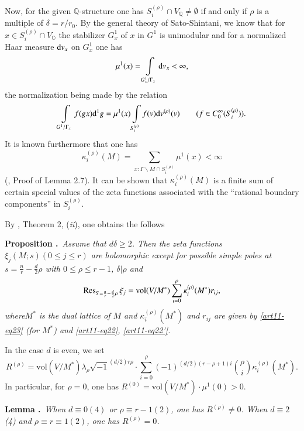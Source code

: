 Now, for the given $\mathbb{Q}$-structure one has $S^{(\rho)}_{i}\cap V_{\mathbb{Q}}\neq \emptyset$ if and only if $\rho$ is a multiple of $\delta=r/r_{0}$. By the general theory of Sato-Shintani, we know that for $x\in S^{(\rho)}_{i}\cap V_{\mathbb{O}}$ the stabilizer $G^{1}_{x}$ of $x$ in $G^{1}$ is unimodular and for a normalized Haar measure $\mathrm{d} v_{x}$ on $G^{1}_{x}$ one has
$$
\mu^{1}(x)=\int\limits_{G^{1}_{x}/\Gamma_{x}}\mathrm{d} v_{x}<\infty,
$$
the normalization being made by the relation
$$
\int\limits_{G^{1}/\Gamma_{x}}f(gx)\mathrm{d}^{1}g=\mu^{1}(x)\int\limits_{S_{i}^{(\rho)}}f(v)\mathrm{d} v^{(\rho)}(v)\qquad (f\in C^{\infty}_{0}(S^{(\rho)}_{i})).
$$
It is known furthermore that one has
\begin{equation}
\kappa_{i}^{(\rho)}(M)=\sum\limits_{x:\Gamma\backslash M\cap S_{i}^{(\rho)}}\mu^{1}(x)<\infty\label{art11-eq23}
\end{equation}
(\cite{art11-keySS}, Proof of Lemma 2.7). It can be shown that $\kappa^{(\rho)}_{i}(M)$ is a finite sum of certain special values of the zeta functions associated with the ``rational boundary components'' in $S^{(\rho)}_{i}$.

By \cite{art11-keySS}, Theorem 2, ({\em ii}), one obtains the follows

\medskip
\noindent
{\bf Proposition .\label{art11-prop2}}~{\em Assume that $d\delta \geq 2$. Then the zeta functions $\xi_{j}(M;s)(0\leq j\leq r)$ are holomorphic except for possible simple poles at $s=\frac{n}{r}-\frac{d}{2}\rho$ with $0\leq \rho\leq r-1$, $\delta |\rho$ and}
\begin{equation}
\operatorname{Res}_{S=\frac{n}{r}-\frac{d}{2}\rho}\xi_{j}=\text{vol} (V/M^{*})\sum\limits^{\rho}_{i=0}\kappa^{(\rho)}_{i}(M^{*})r_{ij},\label{art11-eq24}
\end{equation}
{\em where\pageoriginale $M^{*}$ is the dual lattice of $M$ and $\kappa^{(\rho)}_{i}(M^{*})$ and $r_{ij}$ are given by \eqref{art11-eq23} (for $M^{*}$) and \eqref{art11-eq22}, \eqref{art11-eq22'}.}

In the case $d$ is even, we set
\begin{equation}
R^{(\rho)}=\text{vol}(V/M^{*})\lambda_{\rho}\sqrt{-1}^{(d/2)r\rho}\cdot \sum\limits^{\rho}_{i=0}(-1)^{(d/2)(r-\rho+1)i}\binom{\rho}{i}\kappa^{(\rho)}_{i}(M^{*}).\label{art11-eq25}
\end{equation}
In particular, for $\rho=0$, one has $R^{(0)}=\text{vol}(V/M^{*})\cdot \mu^{1}(0)>0$.

\medskip
\noindent
{\bf Lemma .\label{art11-lem4}}~{\em When $d\equiv 0(4)$ or $\rho\equiv r-1(2)$, one has $R^{(\rho)}\neq 0$. When $d\equiv 2$ (4) and $\rho\equiv r\equiv 1(2)$, one has $R^{(\rho)}=0$.}


